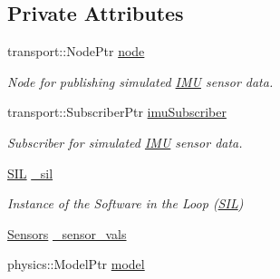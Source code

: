 \subsection*{\-Private \-Attributes}
\begin{DoxyCompactItemize}
\item 
\hypertarget{classgazebo_1_1GazeboModelPlugin_a2571cf379d4745beb5442ae21f645f25}{transport\-::\-Node\-Ptr \hyperlink{classgazebo_1_1GazeboModelPlugin_a2571cf379d4745beb5442ae21f645f25}{node}}\label{classgazebo_1_1GazeboModelPlugin_a2571cf379d4745beb5442ae21f645f25}

\begin{DoxyCompactList}\small\item\em \-Node for publishing simulated \hyperlink{classIMU}{\-I\-M\-U} sensor data. \end{DoxyCompactList}\item 
\hypertarget{classgazebo_1_1GazeboModelPlugin_a6bb4e9927e64ad53d649535e2ef8d0b0}{transport\-::\-Subscriber\-Ptr \hyperlink{classgazebo_1_1GazeboModelPlugin_a6bb4e9927e64ad53d649535e2ef8d0b0}{imu\-Subscriber}}\label{classgazebo_1_1GazeboModelPlugin_a6bb4e9927e64ad53d649535e2ef8d0b0}

\begin{DoxyCompactList}\small\item\em \-Subscriber for simulated \hyperlink{classIMU}{\-I\-M\-U} sensor data. \end{DoxyCompactList}\item 
\hypertarget{classgazebo_1_1GazeboModelPlugin_a69d01118cf06d61fea5e62ee77489b8a}{\hyperlink{classSIL}{\-S\-I\-L} \hyperlink{classgazebo_1_1GazeboModelPlugin_a69d01118cf06d61fea5e62ee77489b8a}{\-\_\-sil}}\label{classgazebo_1_1GazeboModelPlugin_a69d01118cf06d61fea5e62ee77489b8a}

\begin{DoxyCompactList}\small\item\em \-Instance of the \-Software in the \-Loop (\hyperlink{classSIL}{\-S\-I\-L}) \end{DoxyCompactList}\item 
\hyperlink{classSensors}{\-Sensors} \hyperlink{classgazebo_1_1GazeboModelPlugin_a1e9a41b9fd8c68ac969d97f933db0198}{\-\_\-sensor\-\_\-vals}
\item 
\hypertarget{classgazebo_1_1GazeboModelPlugin_a0fbfe75bffa843ac952e1d08ea67110f}{physics\-::\-Model\-Ptr \hyperlink{classgazebo_1_1GazeboModelPlugin_a0fbfe75bffa843ac952e1d08ea67110f}{model}}\label{classgazebo_1_1GazeboModelPlugin_a0fbfe75bffa843ac952e1d08ea67110f}


\end{DoxyCompactItemize}
